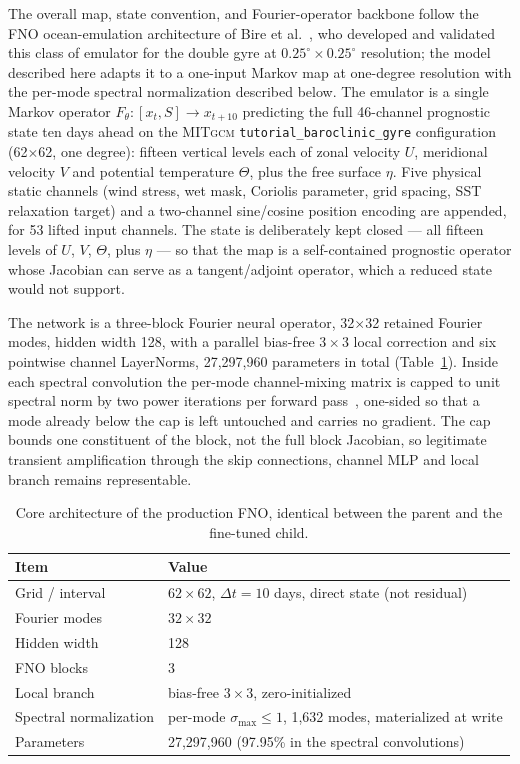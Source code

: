 \documentclass[3p,12pt]{elsarticle}
\newcommand{\MITgcm}{\textsc{MITgcm}}
\newcommand{\FNO}{FNO}
\begin{document}
The overall map, state convention, and Fourier-operator backbone follow the FNO
ocean-emulation architecture of Bire et al.~\cite{Bire2025}, who developed and
validated this class of emulator for the double gyre at $0.25^\circ\times0.25^\circ$
resolution; the model described here adapts it to a one-input Markov map at
one-degree resolution with the per-mode spectral normalization described below.
The emulator is a single Markov operator $F_\theta:[x_t,S]\to x_{t+10}$ predicting
the full 46-channel prognostic state ten days ahead on the \MITgcm{}
\texttt{tutorial\_baroclinic\_gyre} configuration (62$\times$62, one degree):
fifteen vertical levels each of zonal velocity $U$, meridional velocity $V$ and
potential temperature $\Theta$, plus the free surface $\eta$. Five physical
static channels (wind stress, wet mask, Coriolis parameter, grid spacing, SST
relaxation target) and a two-channel sine/cosine position encoding are appended,
for 53 lifted input channels. The state is deliberately kept closed --- all
fifteen levels of $U$, $V$, $\Theta$, plus $\eta$ --- so that the map is a
self-contained prognostic operator whose Jacobian can serve as a tangent/adjoint
operator, which a reduced state would not support.

The network is a three-block Fourier neural operator, 32$\times$32 retained
Fourier modes, hidden width 128, with a parallel bias-free $3\times3$ local
correction and six pointwise channel LayerNorms, 27{,}297{,}960 parameters in
total (Table~\ref{tab:arch}). Inside each spectral convolution the per-mode
channel-mixing matrix is capped to unit spectral norm by two power iterations
per forward pass~\cite{McCabe2023}, one-sided so that a mode already below the cap is left
untouched and carries no gradient. The cap bounds one constituent of the block,
not the full block Jacobian, so legitimate transient amplification through the
skip connections, channel MLP and local branch remains representable.

\begin{table}[H]
\centering
\begin{tabular}{ll}
\toprule
Item & Value \\
\midrule
Grid / interval & $62\times62$, $\Delta t=10$ days, direct state (not residual) \\
Fourier modes & $32\times32$ \\
Hidden width & 128 \\
FNO blocks & 3 \\
Local branch & bias-free $3\times3$, zero-initialized \\
Spectral normalization & per-mode $\sigma_{\max}\le1$, 1{,}632 modes, materialized at write \\
Parameters & 27{,}297{,}960 (97.95\% in the spectral convolutions) \\
\bottomrule
\end{tabular}
\caption{Core architecture of the production \FNO{}, identical between the
parent and the fine-tuned child.}
\label{tab:arch}
\end{table}
\end{document}
